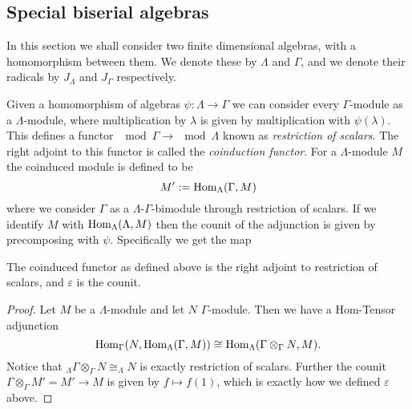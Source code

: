 \subsection{Special biserial algebras}\label{sec:special_biserial_algebras}
\cite{EHIS04}

In this section we shall consider two finite dimensional algebras, with a homomorphism between them. We denote these by $\Lambda$ and $\Gamma$, and we denote their radicals by $J_\Lambda$ and $J_\Gamma$ respectively.

\begin{defn}
	Given a homomorphism of algebras $\psi\colon\Lambda \to \Gamma$ we can consider every $\Gamma$-module as a $\Lambda$-module, where multiplication by $\lambda$ is given by multiplication with $\psi(\lambda)$. This defines a functor $\mod\Gamma \to \mod\Lambda$ known as \emph{restriction of scalars}. The right adjoint to this functor is called the \emph{coinduction functor}. For a $\Lambda$-module $M$ the coinduced module is defined to be
	$$M' := \operatorname{Hom}_\Lambda(\Gamma, M)$$
	where we consider $\Gamma$ as a $\Lambda$-$\Gamma$-bimodule through restriction of scalars. If we identify $M$ with $\operatorname{Hom}_\Lambda(\Lambda, M)$ then the counit of the adjunction is given by precomposing with $\psi$. Specifically we get the map
	\begin{center}
	\end{center}
\end{defn}

\begin{prop}\cite[Lemma~2.2]{EHIS04}\label{prop:coinduction_right_adjoint}
	The coinduced functor as defined above is the right adjoint to restriction of scalars, and $\varepsilon$ is the counit.
	\begin{proof}
		Let $M$ be a $\Lambda$-module and let $N$ $\Gamma$-module. Then we have a Hom-Tensor adjunction
		$$\operatorname{Hom}_\Gamma(N, \operatorname{Hom}_\Lambda(\Gamma, M)) \cong \operatorname{Hom}_\Lambda(\Gamma\otimes_\Gamma N, M).$$
		Notice that $_\Lambda\Gamma\otimes_\Gamma N \cong _\Lambda N$ is exactly restriction of scalars. Further the counit $\Gamma\otimes_\Gamma M' = M' \to M$ is given by $f\mapsto f(1)$, which is exactly how we defined $\varepsilon$ above.
	\end{proof}
\end{prop}

